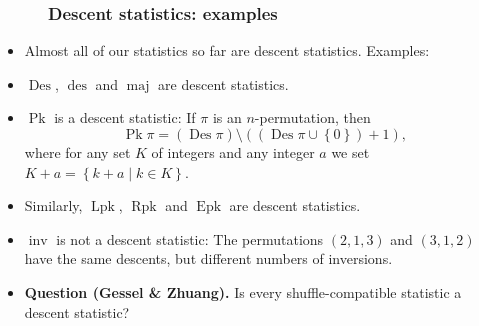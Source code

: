\documentclass{beamer}
\newcommand{\Lpk}{\operatorname{Lpk}}
\newcommand{\Rpk}{\operatorname{Rpk}}
\newcommand{\Pk}{\operatorname{Pk}}
\newcommand{\Epk}{\operatorname{Epk}}
\newcommand{\Des}{\operatorname{Des}}
\newcommand{\des}{\operatorname{des}}
\newcommand{\inv}{\operatorname{inv}}
\newcommand{\maj}{\operatorname{maj}}
\newcommand{\fti}[1]{\frametitle{\ \ \ \ \ #1}}
\newcommand{\set}[1]{\left\{ #1 \right\}}
\newcommand{\tup}[1]{\left( #1 \right)}
\newcommand{\defn}[1]{{\color{darkred}\emph{#1}}} %
\theoremstyle{plain}
\begin{document}
\begin{frame}
\begin{itemize}
\end{itemize}

\vspace{10cm}

\end{frame}

\begin{frame}
\fti{Descent statistics: examples}

\begin{itemize}

\item Almost all of our statistics so far are descent statistics.
     Examples:

\pause

\item $\Des$, $\des$ and $\maj$ are descent statistics.

\pause

\item $\Pk$ is a descent statistic: If $\pi$ is an $n$-permutation,
      then
      \[
      \Pk \pi = \tup{\Des \pi} \setminus \tup{\tup{\Des \pi \cup \set{0}} + 1} ,
      \]
      where for any set $K$ of integers and any integer $a$
      we set \defn{$K + a = \set{k + a \mid k \in K}$}.

\item Similarly, $\Lpk$, $\Rpk$ and $\Epk$ are descent statistics.

\pause

\item $\inv$ is not a descent statistic:
      The permutations $\tup{2,1,3}$ and $\tup{3,1,2}$ have the same
      descents, but different numbers of inversions.

\pause

\item \textbf{Question (Gessel \& Zhuang).}
      Is every shuffle-compatible statistic a descent statistic?

\end{itemize}

\end{frame}
\end{document}
